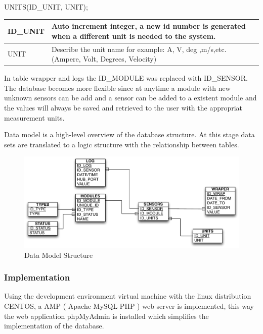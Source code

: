UNITS(ID\_UNIT, UNIT);

\begin{table}[H]
\centering
	\begin{tabular}{| p{2cm} | p{10cm} |}
		\hline
		ID\_UNIT & Auto increment integer, a new id number is generated when a different unit is needed to the system. \\\hline
		UNIT & Describe the unit name for example: A, V, deg ,m/s,etc. (Ampere, Volt, Degrees, Velocity)\\\hline
	\end{tabular}
\end{table}

In table wrapper and logs the ID\_MODULE was replaced with ID\_SENSOR. The database becomes more flexible since at anytime a module with new unknown sensors can be add and a sensor can be added to a existent module and the values will always be saved and retrieved to the user with the appropriat measurement units.

Data model is a high-level overview of the database structure. At this stage data sets are translated to a logic structure with the relationship between tables.

\begin{figure}[H]
	\begin{centering}
		\includegraphics[width=1.0\textwidth]{images/db_structure.pdf}
		\caption{Data Model Structure}
	\end{centering}
\end{figure}


%	
%	
\subsubsection{Implementation}
Using the development environment virtual machine with the linux distribution CENTOS, a AMP ( Apache MySQL PHP ) web server is implemented, this way the web application phpMyAdmin is installed which simplifies the implementation of the database.

